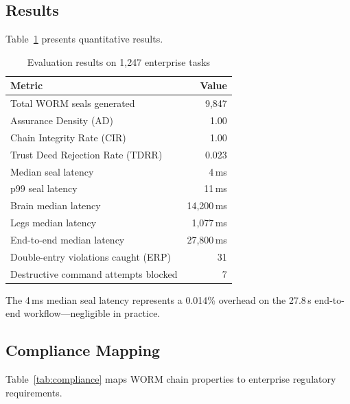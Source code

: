 \documentclass[12pt,letterpaper]{article}
\begin{document}
\subsection{Results}

Table~\ref{tab:results} presents quantitative results.

\begin{table}[h]
\centering
\caption{Evaluation results on 1{,}247 enterprise tasks}
\label{tab:results}
\begin{tabular}{@{}lr@{}}
\toprule
\textbf{Metric} & \textbf{Value} \\
\midrule
Total WORM seals generated          & 9{,}847 \\
Assurance Density (AD)              & 1.00 \\
Chain Integrity Rate (CIR)          & 1.00 \\
Trust Deed Rejection Rate (TDRR)    & 0.023 \\
\midrule
Median seal latency                 & 4\,ms \\
p99 seal latency                    & 11\,ms \\
Brain median latency                & 14{,}200\,ms \\
Legs median latency                 & 1{,}077\,ms \\
End-to-end median latency           & 27{,}800\,ms \\
\midrule
Double-entry violations caught (ERP) & 31 \\
Destructive command attempts blocked & 7 \\
\bottomrule
\end{tabular}
\end{table}

The 4\,ms median seal latency represents a 0.014\% overhead on the 27.8\,s
end-to-end workflow---negligible in practice.

\subsection{Compliance Mapping}

Table~\ref{tab:compliance} maps WORM chain properties to enterprise regulatory
requirements.
\end{document}
